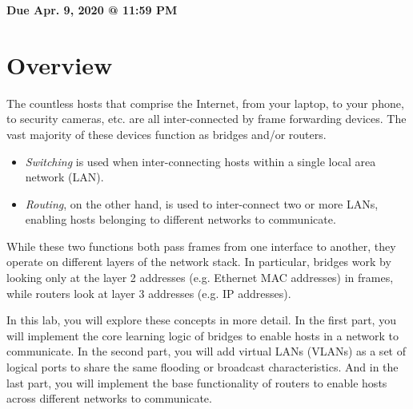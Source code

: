 \documentclass[11pt]{article}
\makeatletter
\def\datedue{Apr. 9, 2020 @ 11:59 PM}
\makeatother
\begin{document}
\maketitle \thispagestyle{fancy}

\hfill {\large \textbf{Due \datedue}}


\section{Overview}
\label{sec:overview}
The countless hosts that comprise the Internet, from your laptop, to your phone, to security cameras, etc. are all inter-connected by frame forwarding devices.
The vast majority of these devices function as bridges and/or routers.
\begin{itemize}
    \item \textit{Switching} is used when inter-connecting hosts within a single local area network (LAN).
    \item \textit{Routing}, on the other hand, is used to inter-connect two or more LANs, enabling hosts belonging to different networks to communicate.
\end{itemize}
While these two functions both pass frames from one interface to another, they operate on different layers of the network stack.
In particular, bridges work by looking only at the layer 2 addresses (e.g. Ethernet MAC addresses) in frames, while routers look at layer 3 addresses (e.g. IP addresses).

In this lab, you will explore these concepts in more detail.
In the first part, you will implement the core learning logic of bridges to enable hosts in a network to communicate.
In the second part, you will add virtual LANs (VLANs) as a set of logical ports to share the same flooding or broadcast characteristics.
And in the last part, you will implement the base functionality of routers to enable hosts across different networks to communicate.


\end{document}
